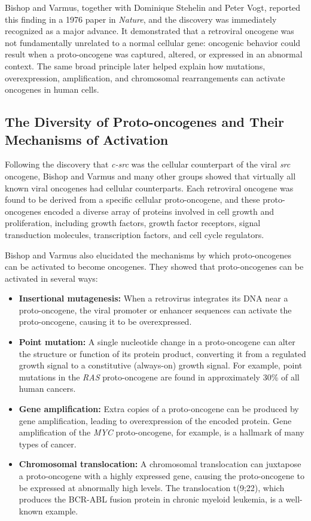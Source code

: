 Bishop and Varmus, together with Dominique Stehelin and Peter Vogt, reported this finding in a 1976 paper in \emph{Nature}, and the discovery was immediately recognized as a major advance. It demonstrated that a retroviral oncogene was not fundamentally unrelated to a normal cellular gene: oncogenic behavior could result when a proto-oncogene was captured, altered, or expressed in an abnormal context. The same broad principle later helped explain how mutations, overexpression, amplification, and chromosomal rearrangements can activate oncogenes in human cells.

\subsection{The Diversity of Proto-oncogenes and Their Mechanisms of Activation}

Following the discovery that \emph{c-src} was the cellular counterpart of the viral \emph{src} oncogene, Bishop and Varmus and many other groups showed that virtually all known viral oncogenes had cellular counterparts. Each retroviral oncogene was found to be derived from a specific cellular proto-oncogene, and these proto-oncogenes encoded a diverse array of proteins involved in cell growth and proliferation, including growth factors, growth factor receptors, signal transduction molecules, transcription factors, and cell cycle regulators.

Bishop and Varmus also elucidated the mechanisms by which proto-oncogenes can be activated to become oncogenes. They showed that proto-oncogenes can be activated in several ways:

\begin{itemize}
 \item \textbf{Insertional mutagenesis:} When a retrovirus integrates its DNA near a proto-oncogene, the viral promoter or enhancer sequences can activate the proto-oncogene, causing it to be overexpressed.
 \item \textbf{Point mutation:} A single nucleotide change in a proto-oncogene can alter the structure or function of its protein product, converting it from a regulated growth signal to a constitutive (always-on) growth signal. For example, point mutations in the \emph{RAS} proto-oncogene are found in approximately 30\% of all human cancers.
 \item \textbf{Gene amplification:} Extra copies of a proto-oncogene can be produced by gene amplification, leading to overexpression of the encoded protein. Gene amplification of the \emph{MYC} proto-oncogene, for example, is a hallmark of many types of cancer.
 \item \textbf{Chromosomal translocation:} A chromosomal translocation can juxtapose a proto-oncogene with a highly expressed gene, causing the proto-oncogene to be expressed at abnormally high levels. The translocation t(9;22), which produces the BCR-ABL fusion protein in chronic myeloid leukemia, is a well-known example.
\end{itemize}

